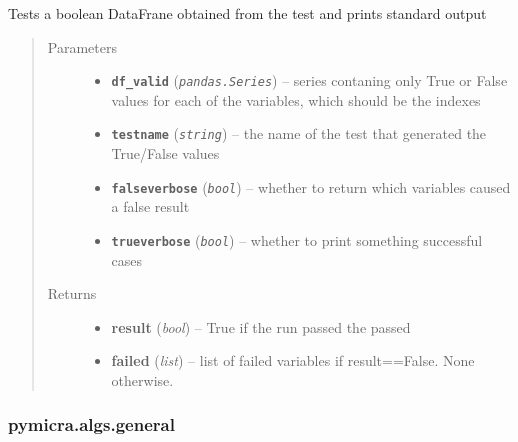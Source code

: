 \documentclass[a4paper,10pt,oneside]{sphinxmanual}
\begin{document}
\begin{fulllineitems}
\label{pymicra.algs:pymicra.algs.auxiliar.testValid}
Tests a boolean DataFrane obtained from the test and prints standard output
\begin{quote}\begin{description}
\item[{Parameters}] \leavevmode\begin{itemize}
\item {} 
\textbf{\texttt{df\_valid}} (\emph{\texttt{pandas.Series}}) -- series contaning only True or False values for each of the variables, which should be the indexes

\item {} 
\textbf{\texttt{testname}} (\emph{\texttt{string}}) -- the name of the test that generated the True/False values

\item {} 
\textbf{\texttt{falseverbose}} (\emph{\texttt{bool}}) -- whether to return which variables caused a false result

\item {} 
\textbf{\texttt{trueverbose}} (\emph{\texttt{bool}}) -- whether to print something successful cases

\end{itemize}

\item[{Returns}] \leavevmode
\begin{itemize}
\item {} 
\textbf{result} (\emph{bool}) -- True if the run passed the passed

\item {} 
\textbf{failed} (\emph{list}) -- list of failed variables if result==False. None otherwise.

\end{itemize}


\end{description}\end{quote}

\end{fulllineitems}



\subsubsection{pymicra.algs.general}
\label{pymicra.algs:pymicra-algs-general}\label{pymicra.algs:module-pymicra.algs.general}
\end{document}

